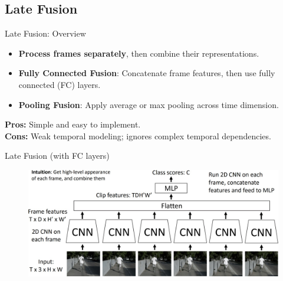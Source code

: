 \subsection{Late Fusion}

\begin{frame}[allowframebreaks]{Late Fusion: Overview}
    \begin{itemize}
        \item \textbf{Process frames separately}, then combine their representations.
        \item \textbf{Fully Connected Fusion}: Concatenate frame features, then use fully connected (FC) layers.
        \item \textbf{Pooling Fusion}: Apply average or max pooling across time dimension.
    \end{itemize}
    \vspace{1em}
    \textbf{Pros:} Simple and easy to implement.\\
    \textbf{Cons:} Weak temporal modeling; ignores complex temporal dependencies.
\end{frame}

\begin{frame}[allowframebreaks]{Late Fusion (with FC layers)}
    \begin{figure}
        \centering
        \includegraphics[width=1\textwidth,height=0.9\textheight,keepaspectratio]{images/video/slide_10_1_img.jpg}
    \end{figure}
\end{frame}

